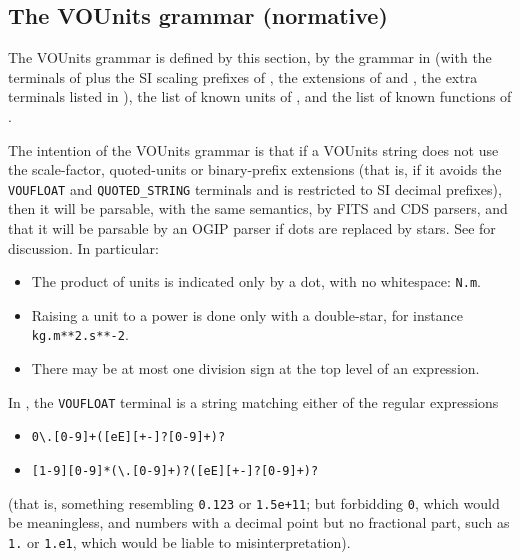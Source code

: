\documentclass[11pt,a4paper]{ivoa}
\begin{document}
\subsection{The VOUnits grammar (normative)\label{appx:vougrammar}}

The VOUnits grammar is defined by this section,
by the grammar in 
(with the terminals of 
plus
the SI scaling prefixes of ,
the extensions of  and ,
the extra terminals listed in ),
the list of known units of ,
and the list of known functions of .

The intention of the VOUnits grammar is that if a VOUnits string
does not use the scale-factor, quoted-units or binary-prefix
extensions
(that is, if it avoids the \texttt{VOUFLOAT}
and \texttt{QUOTED\_STRING} terminals and is restricted to SI decimal prefixes),
then it will be parsable, with the same semantics, by FITS
and CDS parsers, and that it will be parsable by an OGIP parser if
dots are replaced by stars.
See  for discussion.
In particular:
\begin{itemize}
\item The product of units is indicated only by a dot, with no
  whitespace: \texttt{N.m}.
\item Raising a unit to a power is done only with a double-star, for
  instance \texttt{kg.m**2.s**-2}.
\item There may be at most one division sign at the top level of an
  expression.
\end{itemize}

In , the \texttt{VOUFLOAT} terminal is a
string matching either of the regular expressions
\begin{itemize}
\item\texttt{0\textbackslash.[0-9]+([eE][+-]?[0-9]+)?}
\item\texttt{[1-9][0-9]*(\textbackslash.[0-9]+)?([eE][+-]?[0-9]+)?}
\end{itemize}
(that is, something resembling \texttt{0.123} or \texttt{1.5e+11};
but forbidding \texttt{0}, which would be meaningless, and numbers
with a decimal point but no fractional part, such as \texttt{1.}
or \texttt{1.e1}, which would be liable to misinterpretation).
\end{document}
